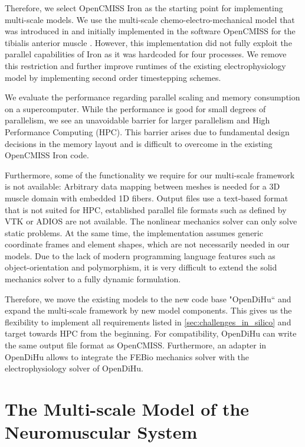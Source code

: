 Therefore, we select OpenCMISS Iron as the starting point for implementing multi-scale models. We use the multi-scale chemo-electro-mechanical model that was introduced in \cite{Roehrle2012} and initially implemented in the software OpenCMISS for the tibialis anterior muscle \cite{Heidlauf2013}. However, this implementation did not fully exploit the parallel capabilities of Iron as it was hardcoded for four processes. We remove this restriction and further improve runtimes of the existing electrophysiology model by implementing second order timestepping schemes.

We evaluate the performance regarding parallel scaling and memory consumption on a supercomputer. While the performance is good for small degrees of parallelism, we see an unavoidable barrier for larger parallelism and High Performance Computing (HPC). This barrier arises due to fundamental design decisions in the memory layout and is difficult to overcome in the existing OpenCMISS Iron code.

Furthermore, some of the functionality we require for our multi-scale framework is not available: Arbitrary data mapping between meshes is needed for a 3D muscle domain with embedded 1D fibers. Output files use a text-based format that is not suited for HPC, established parallel file formats such as defined by VTK or ADIOS are not available. The nonlinear mechanics solver can only solve static problems. At the same time, the implementation assumes generic coordinate frames and element shapes, which are not necessarily needed in our models. Due to the lack of modern programming language features such as object-orientation and polymorphism, it is very difficult to extend the solid mechanics solver to a fully dynamic formulation.

Therefore, we move the existing models to the new code base "OpenDiHu`` and expand the multi-scale framework by new model components. This gives us the flexibility to implement all requirements listed in \cref{sec:challenges_in_silico} and target towards HPC from the beginning. For compatibility, OpenDiHu can write the same output file format as OpenCMISS. Furthermore, an adapter in OpenDiHu allows to integrate the FEBio mechanics solver with the electrophysiology solver of OpenDiHu.

\section{The Multi-scale Model of the Neuromuscular System}\label{sec:the_multi_scale_model_of}

